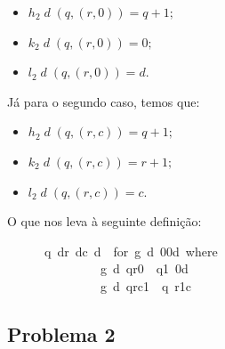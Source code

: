\documentclass[a4paper]{article}
\newcommand{\Varid}[1]{\mathit{#1}}
\begin{document}
\begin{itemize}
     \item \ensuremath{h_2 \;\Varid{d}\;(\Varid{q},(\Varid{r},\mathrm{0}))\mathrel{=}\Varid{q}\mathbin{+}\mathrm{1};}
     \item \ensuremath{k_2 \;\Varid{d}\;(\Varid{q},(\Varid{r},\mathrm{0}))\mathrel{=}\mathrm{0};}
     \item \ensuremath{l_2 \;\Varid{d}\;(\Varid{q},(\Varid{r},\mathrm{0}))\mathrel{=}\Varid{d}}.
\end{itemize}


Já para o segundo caso, temos que:

\begin{itemize}
     \item \ensuremath{h_2 \;\Varid{d}\;(\Varid{q},(\Varid{r},\Varid{c}))\mathrel{=}\Varid{q}\mathbin{+}\mathrm{1};}
     \item \ensuremath{k_2 \;\Varid{d}\;(\Varid{q},(\Varid{r},\Varid{c}))\mathrel{=}\Varid{r}\mathbin{+}\mathrm{1};}
     \item \ensuremath{l_2 \;\Varid{d}\;(\Varid{q},(\Varid{r},\Varid{c}))\mathrel{=}\Varid{c}}.
\end{itemize}


O que nos leva à seguinte definição:
\begin{tabbing}\ttfamily
~~~~~~q~dr~dc~d~~for~g~d~00d~where~\\
\ttfamily ~~~~~~~~~~~~~~~g~d~qr0~~q1~0d\\
\ttfamily ~~~~~~~~~~~~~~~g~d~qrc1~~q~r1c
\end{tabbing}

\subsection*{Problema 2}
\end{document}
